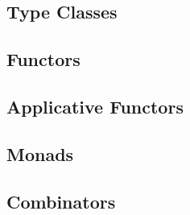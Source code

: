 \documentclass[thesis.tex]{subfiles}
\begin{document}
\subsection{Type Classes}

\subsection{Functors}

\subsection{Applicative Functors}

\subsection{Monads}

\subsection{Combinators}
\end{document}
